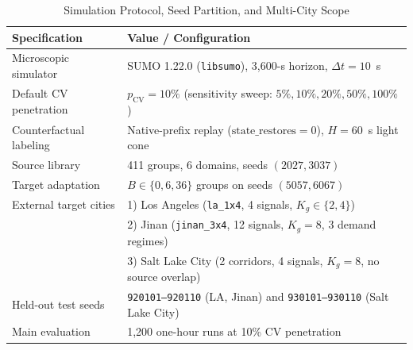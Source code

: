 \documentclass[letterpaper,journal]{IEEEtran}
\begin{document}
\begin{table}[!t]
\centering
\caption{Simulation Protocol, Seed Partition, and Multi-City Scope}
\label{tab:setup}
\begin{tabular}{@{}lp{}@{}}
\toprule
Specification & Value / Configuration\\
\midrule
Microscopic simulator & SUMO 1.22.0 (\texttt{libsumo}), 3,600-s horizon, $\Delta t=10$~s\\
Default CV penetration & $p_{\mathrm{CV}}=10\%$ (sensitivity sweep: $5\%,10\%,20\%,50\%,100\%$)\\
Counterfactual labeling & Native-prefix replay ($\text{state\_restores}=0$), $H=60$~s light cone\\
Source library & 411 groups, 6 domains, seeds $(2027,3037)$\\
Target adaptation & $B\in\{0,6,36\}$ groups on seeds $(5057,6067)$\\
External target cities & 1) Los Angeles (\texttt{la\_1x4}, 4 signals, $K_g\in\{2,4\}$)\\
 & 2) Jinan (\texttt{jinan\_3x4}, 12 signals, $K_g=8$, 3 demand regimes)\\
 & 3) Salt Lake City (2 corridors, 4 signals, $K_g=8$, no source overlap)\\
Held-out test seeds & \texttt{920101--920110} (LA, Jinan) and \texttt{930101--930110} (Salt Lake City)\\
Main evaluation & 1,200 one-hour runs at 10\% CV penetration\\
\bottomrule
\end{tabular}
\end{table}
\end{document}
